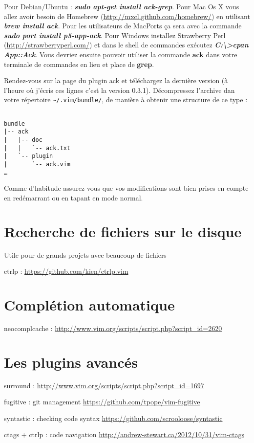 Pour Debian/Ubuntu : \textbf{\emph{sudo apt-get install ack-grep}}. Pour Mac Os X vous allez avoir besoin de Homebrew (\url{http://mxcl.github.com/homebrew/}) en utilisant \textbf{\emph{brew install ack}}. Pour les utilisateurs de MacPorts ça sera avec la commande \textbf{\emph{sudo port install p5-app-ack}}. Pour Windows installez Strawberry Perl (\url{http://strawberryperl.com/}) et dans le shell de commandes exécutez \textbf{\emph{C:\textbackslash>cpan App::Ack}}. Vous devriez ensuite pouvoir utiliser la commande \textbf{ack} dans votre terminale de commandes en lieu et place de \textbf{grep}.

Rendez-vous sur la page du plugin ack et téléchargez la dernière version (à l'heure où j'écris ces lignes c'est la version 0.3.1). Décompressez l'archive dan votre répertoire \Verb|~/.vim/bundle/|, de manière à obtenir une structure de ce type :

\begin{verbatim}

bundle
|-- ack
|   |-- doc
|   |   `-- ack.txt
|   `-- plugin
|       `-- ack.vim
…
\end{verbatim}

Comme d'habitude assurez-vous que vos modifications sont bien prises en compte en redémarrant \vim ou en tapant  en mode normal.

\section{Recherche de fichiers sur le disque}

Utile pour de grands projets avec beaucoup de fichiers

ctrlp : \url{https://github.com/kien/ctrlp.vim}

\section{Complétion automatique}

neocomplcache : \url{http://www.vim.org/scripts/script.php?script\_id=2620}

\section{Les plugins avancés}

surround : \url{http://www.vim.org/scripts/script.php?script\_id=1697}

fugitive : git management \url{https://github.com/tpope/vim-fugitive}

syntastic : checking code syntax \url{https://github.com/scrooloose/syntastic}

ctags + ctrlp : code navigation \url{http://andrew-stewart.ca/2012/10/31/vim-ctags}
